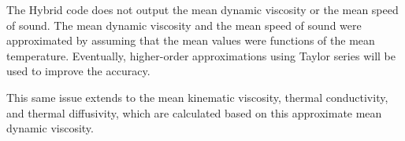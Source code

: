 The Hybrid code does not output the mean dynamic viscosity or the mean speed of
sound.  The mean dynamic viscosity and the mean speed of sound were
approximated by assuming that the mean values were functions of the mean
temperature.  Eventually, higher-order approximations using Taylor series will
be used to improve the accuracy.

This same issue extends to the mean kinematic viscosity, thermal conductivity,
and thermal diffusivity, which are calculated based on this approximate mean
dynamic viscosity.
